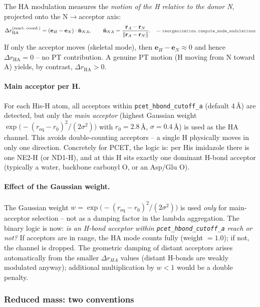 \documentclass[11pt,a4paper,twoside]{article}
\newcommand{\codref}[1]{%
  \quad\text{\textcolor{gray!70!black}{\footnotesize $\rightsquigarrow$~\texttt{#1}}}}
\theoremstyle{remark}
\begin{document}
The HA modulation measures the
\emph{motion of the H relative to the donor N}, projected onto
the N$\to$acceptor axis:
\begin{equation}
  \Delta r_\text{HA}^\text{(react.\ coord.)}
  = (\mathbf{e}_H - \mathbf{e}_N) \cdot \hat{\mathbf{n}}_{NA},
  \qquad
  \hat{\mathbf{n}}_{NA} = \frac{\mathbf{r}_A - \mathbf{r}_N}{\|\mathbf{r}_A - \mathbf{r}_N\|}.
  \codref{reorganization.compute\_mode\_modulations}
  \label{eq:dr-reaction-coord}
\end{equation}
If only the acceptor moves (skeletal mode), then
$\mathbf{e}_H - \mathbf{e}_N \approx 0$ and hence
$\Delta r_\text{HA} = 0$ -- no PT contribution. A genuine PT
motion (H moving from N toward A) yields, by contrast,
$\Delta r_\text{HA} > 0$.

\paragraph{Main acceptor per H.}
For each His-H atom, all acceptors within
\texttt{pcet\_hbond\_cutoff\_a} (default 4\,\AA) are detected, but
only the \emph{main acceptor} (highest Gaussian weight
$\exp\bigl(-(r_{\text{eq}} - r_0)^2/(2\sigma^2)\bigr)$ with
$r_0 = 2.8$\,\AA, $\sigma = 0.4$\,\AA) is used as the HA channel.
This avoids double-counting acceptors -- a single H physically
moves in only one direction. Concretely for PCET, the logic is:
per His imidazole there is one NE2-H (or ND1-H), and at this H
sits exactly one dominant H-bond acceptor (typically a water,
backbone carbonyl O, or an Asp/Glu O).

\paragraph{Effect of the Gaussian weight.}
The Gaussian weight
$w = \exp\bigl(-(r_{\text{eq}} - r_0)^2/(2\sigma^2)\bigr)$
is used \emph{only} for main-acceptor selection -- not as a
damping factor in the lambda aggregation. The binary logic is
now: \emph{is an H-bond acceptor within
\texttt{pcet\_hbond\_cutoff\_a} reach or not?} If acceptors are in
range, the HA mode counts fully (weight $= 1.0$); if not, the
channel is dropped. The geometric damping of distant acceptors
arises automatically from the smaller $\Delta r_{HA}$ values
(distant H-bonds are weakly modulated anyway); additional
multiplication by $w < 1$ would be a double penalty.

\subsubsection*{Reduced mass: two conventions}
\end{document}
